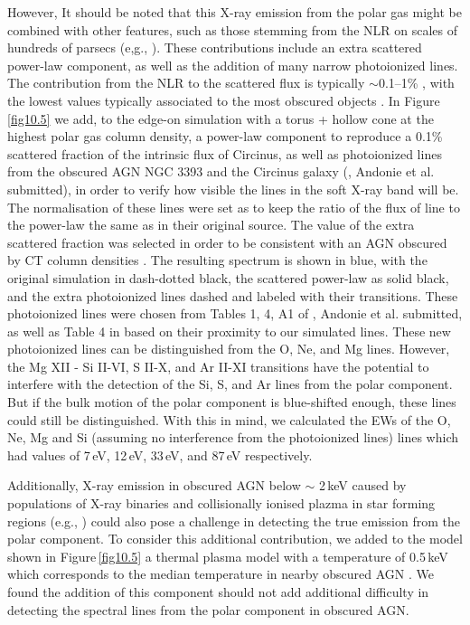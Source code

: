 \documentclass[fleqn,usenatbib]{mnras}
\begin{document}
            However, It should be noted that this X-ray emission from the polar gas might be combined with other features, such as those stemming from the NLR on scales of hundreds of parsecs (e,g., \citealp{2006A&A...448..499B, 2007MNRAS.374.1290G}). These contributions include an extra scattered power-law component, as well as the addition of many narrow photoionized lines. The contribution from the NLR to the scattered flux is typically $\sim$0.1--1\% \citep{Ueda_2007,2017ApJS..233...17R, 2021MNRAS.504..428G}, with the lowest values typically associated to the most obscured objects \citep{2021MNRAS.504..428G}. In Figure\,\ref{fig10.5} we add, to the edge-on simulation with a torus + hollow cone at the highest polar gas column density, a power-law component to reproduce a 0.1\% scattered fraction of the intrinsic flux of Circinus, as well as photoionized lines from the obscured AGN NGC 3393 \citep{2006A&A...448..499B} and the Circinus galaxy (\citealp{2001ApJ...546L..13S, 2014ApJ...791...81A}, Andonie et al. submitted), in order to verify how visible the lines in the soft X-ray band will be. The normalisation of these lines were set as to keep the ratio of the flux of line to the power-law the same as in their original source. The value of the extra scattered fraction was selected in order to be consistent with an AGN obscured by CT column densities \citep{2021MNRAS.504..428G}. The resulting spectrum is shown in blue, with the original simulation in dash-dotted black, the scattered power-law as solid black, and the extra photoionized lines dashed and labeled with their transitions. These photoionized lines were chosen from Tables 1, 4, A1 of \citealp{2001ApJ...546L..13S, 2014ApJ...791...81A}, Andonie et al. submitted, as well as Table 4 in \cite{2006A&A...448..499B} based on their proximity to our simulated lines. These new photoionized lines can be distinguished from the O, Ne, and Mg lines. However, the Mg XII - Si II-VI, S II-X, and Ar II-XI transitions have the potential to interfere with the detection of the Si, S, and Ar lines from the polar component. But if the bulk motion of the polar component is blue-shifted enough, these lines could still be distinguished. With this in mind, we calculated the EWs of the O, Ne, Mg and Si (assuming no interference from the photoionized lines) lines which had values of 7\,eV, 12\,eV, 33\,eV, and 87\,eV respectively. 
            
            Additionally, X-ray emission in obscured AGN below $\sim$ 2\,keV caused by populations of X-ray binaries and collisionally ionised plazma in star forming regions (e.g., \citealp{2008MNRAS.386.1464R}) could also pose a challenge in detecting the true emission from the polar component. To consider this additional contribution, we added to the model shown in Figure\,\ref{fig10.5} a thermal plasma model with a temperature of 0.5\,keV which corresponds to the median temperature in nearby obscured AGN \citep{2017ApJS..233...17R}. We found the addition of this component should not add additional difficulty in detecting the spectral lines from the polar component in obscured AGN.
            
\end{document}
